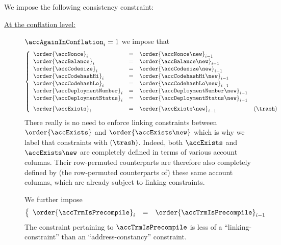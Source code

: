 We impose the following consistency constraint:
\begin{description}
	\item[\underline{At the conflation level:}]
		\If $\accAgainInConflation_{i} = 1$
		\Then we impose that
		\[
			\left\{ \begin{array}{lclr}
				\order{\accNonce            } _{i} & = & \order{\accNonce            \new } _{i - 1}              \\
				\order{\accBalance          } _{i} & = & \order{\accBalance          \new } _{i - 1}              \\
				\order{\accCodesize         } _{i} & = & \order{\accCodesize         \new } _{i - 1}              \\
				\order{\accCodehashHi       } _{i} & = & \order{\accCodehashHi       \new } _{i - 1}              \\
				\order{\accCodehashLo       } _{i} & = & \order{\accCodehashLo       \new } _{i - 1}              \\
				\order{\accDeploymentNumber } _{i} & = & \order{\accDeploymentNumber \new } _{i - 1}              \\
				\order{\accDeploymentStatus } _{i} & = & \order{\accDeploymentStatus \new } _{i - 1} \vspace{2mm} \\
				\order{\accExists           } _{i} & = & \order{\accExists           \new } _{i - 1}               & (\trash) \\
			\end{array} \right.
		\]
		\saNote{}
		There really is no need to enforce linking constraints between $\order{\accExists}$ and $\order{\accExists \new}$
		which is why we label that constraints with $(\trash)$.
		Indeed, both $\accExists$ and $\accExists \new$ are completely defined in terms of various account columns.
		Their row-permuted counterparts are therefore also completely defined by (the row-permuted counterparts of) these same account columns,
		which are already subject to linking constraints.

		We further impose
		\[
			\left\{ \begin{array}{lclr}
				\order{\accTrmIsPrecompile}_{i}   & = & \order{\accTrmIsPrecompile} _{i - 1} \\
			\end{array} \right.
		\]
		\saNote{}
		The constraint pertaining to $\accTrmIsPrecompile$ is less of a ``linking-constraint''
		than an ``address-constancy'' constraint.


\end{description}
